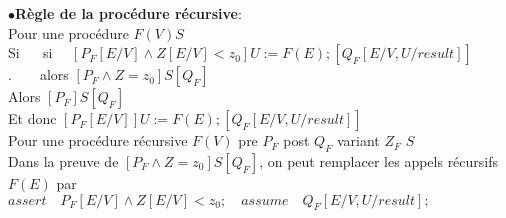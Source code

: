 $\bullet$\textbf{Règle de la procédure récursive}:\\
Pour une procédure $F(V) {S}$\\
Si $\quad$ si $ \quad [P_F[E/V] \wedge Z[E/V]<z_0] U :=F(E); [Q_F[E/V,U/result]] $\\ 
$.\quad \quad $alors $[P_F \wedge Z=z_0]S[Q_F]$\\
Alors $[P_F] S[Q_F]$\\
Et donc $[P_F[E/V]]U:=F(E);[Q_F[E/V,U/result]]$\\

Pour une procédure récursive $F(V)$ pre $P_F$ post $Q_F$ variant $Z_F$ ${S}$\\
Dans la preuve de $[P_F \wedge Z=z_0] S[Q_F]$, on peut remplacer les appels récursifs  $F(E)$ par\\  $assert \quad P_F[E/V] \wedge Z[E/V]<z_0; \quad assume \quad Q_F[E/V,U/result];$\\
